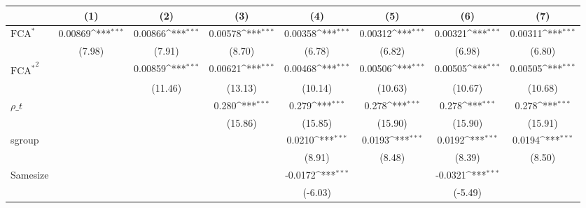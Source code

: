 {
\def\sym#1{\ifmmode^{#1}\else\(^{#1}\)\fi}
\begin{tabular}{l*{7}{c}}
\hline\hline
                    &\multicolumn{1}{c}{(1)}         &\multicolumn{1}{c}{(2)}         &\multicolumn{1}{c}{(3)}         &\multicolumn{1}{c}{(4)}         &\multicolumn{1}{c}{(5)}         &\multicolumn{1}{c}{(6)}         &\multicolumn{1}{c}{(7)}         \\
\hline
$ \text{FCA}^* $    &     0.00869\sym{***}&     0.00866\sym{***}&     0.00578\sym{***}&     0.00358\sym{***}&     0.00312\sym{***}&     0.00321\sym{***}&     0.00311\sym{***}\\
                    &      (7.98)         &      (7.91)         &      (8.70)         &      (6.78)         &      (6.82)         &      (6.98)         &      (6.80)         \\
[1em]
 $ { \text{FCA} ^ * } ^2 $&                     &     0.00859\sym{***}&     0.00621\sym{***}&     0.00468\sym{***}&     0.00506\sym{***}&     0.00505\sym{***}&     0.00505\sym{***}\\
                    &                     &     (11.46)         &     (13.13)         &     (10.14)         &     (10.63)         &     (10.67)         &     (10.68)         \\
[1em]
$ \rho\_t $          &                     &                     &       0.280\sym{***}&       0.279\sym{***}&       0.278\sym{***}&       0.278\sym{***}&       0.278\sym{***}\\
                    &                     &                     &     (15.86)         &     (15.85)         &     (15.90)         &     (15.90)         &     (15.91)         \\
[1em]
sgroup              &                     &                     &                     &      0.0210\sym{***}&      0.0193\sym{***}&      0.0192\sym{***}&      0.0194\sym{***}\\
                    &                     &                     &                     &      (8.91)         &      (8.48)         &      (8.39)         &      (8.50)         \\
[1em]
Samesize            &                     &                     &                     &     -0.0172\sym{***}&                     &     -0.0321\sym{***}&                     \\
                    &                     &                     &                     &     (-6.03)         &                     &     (-5.49)         &                     \\

\end{tabular}}
